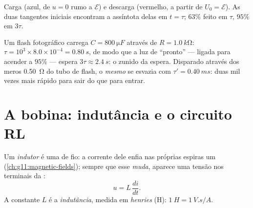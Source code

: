 \begin{omfigure}

{\small Carga (azul, de $u = 0$ rumo a $\mathcal{E}$) e descarga (vermelho, a partir de
$U_0 = \mathcal{E}$). As duas tangentes iniciais encontram a assíntota delas em
$t = \tau$; $63\%$ feito em $\tau$, $95\%$ em $3\tau$.}
\end{omfigure}

\begin{example}\label{ex:g12:rc-rl-circuits:flashrc}
Um flash fotográfico carrega $C = \qty{800}{\micro F}$ através de
$R = \qty{1.0}{k\ohm}$: $\tau = 10^3 \times 8.0\times10^{-4} = \qty{0.80}{s}$, de modo
que a luz de ``pronto'' --- ligada para acender a $95\%$ --- espera
$3\tau \approx \qty{2.4}{s}$: o zunido da espera. Disparado através dos meros
\qty{0.50}{\ohm} do tubo de flash, o \emph{mesmo}  se esvazia com
$\tau' = \qty{0.40}{ms}$: duas mil vezes mais rápido para sair do que para entrar.
\end{example}

\section{A bobina: indutância e o circuito RL}

\begin{definition}\label{def:g12:rc-rl-circuits:inductor}
Um \emph{indutor} é uma  de fio: a corrente dele enfia nas próprias
espiras um  (\cref{ch:g11:magnetic-fields}); sempre que esse 
\emph{muda}, aparece uma tensão nos terminais da :
\[
u = L\,\frac{di}{dt} .
\]
A constante $L$ é a \emph{indutância}, medida em
\emph{henries} (\unit{H}): $\qty{1}{H} = \qty{1}{V.s/A}$.
\end{definition}
\admitted

